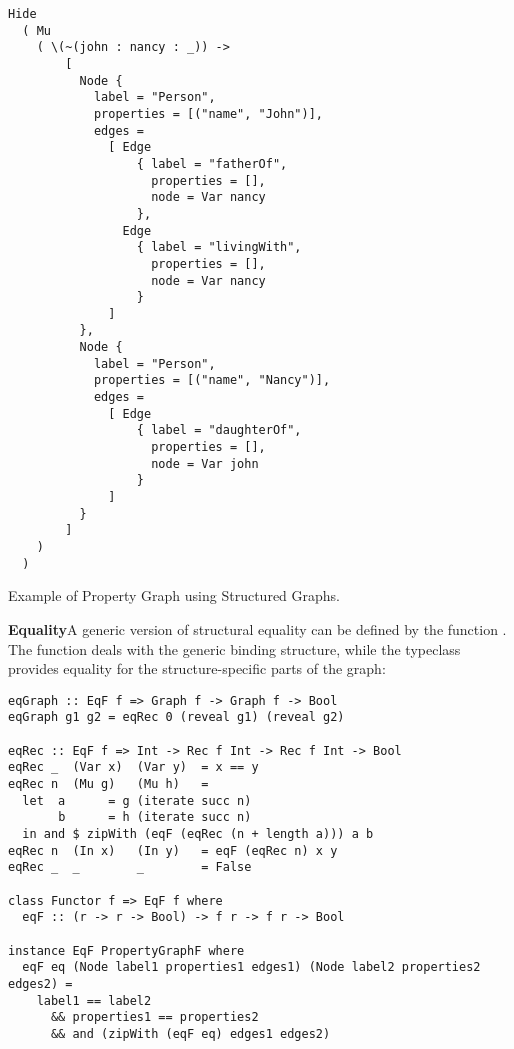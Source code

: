 \begin{listing}[H]
\begin{verbatim}
Hide
  ( Mu
    ( \(~(john : nancy : _)) ->
        [
          Node {
            label = "Person",
            properties = [("name", "John")],
            edges =
              [ Edge
                  { label = "fatherOf",
                    properties = [],
                    node = Var nancy
                  },
                Edge
                  { label = "livingWith",
                    properties = [],
                    node = Var nancy
                  }
              ]
          },
          Node {
            label = "Person",
            properties = [("name", "Nancy")],
            edges =
              [ Edge
                  { label = "daughterOf",
                    properties = [],
                    node = Var john
                  }
              ]
          }
        ]
    )
  )
\end{verbatim}
\caption{Example of Property Graph using Structured Graphs.}
\label{lst:property-graph-example}
\end{listing}

\textbf{Equality}\quad A generic version of structural equality can be defined by the function . The function  deals with the generic binding structure, while the typeclass  provides equality for the structure-specific parts of the graph:

\vspace{1mm}
\begin{verbatim}
eqGraph :: EqF f => Graph f -> Graph f -> Bool
eqGraph g1 g2 = eqRec 0 (reveal g1) (reveal g2)

eqRec :: EqF f => Int -> Rec f Int -> Rec f Int -> Bool
eqRec _  (Var x)  (Var y)  = x == y
eqRec n  (Mu g)   (Mu h)   =
  let  a      = g (iterate succ n)
       b      = h (iterate succ n)
  in and $ zipWith (eqF (eqRec (n + length a))) a b
eqRec n  (In x)   (In y)   = eqF (eqRec n) x y
eqRec _  _        _        = False

class Functor f => EqF f where
  eqF :: (r -> r -> Bool) -> f r -> f r -> Bool

instance EqF PropertyGraphF where
  eqF eq (Node label1 properties1 edges1) (Node label2 properties2 edges2) =
    label1 == label2
      && properties1 == properties2
      && and (zipWith (eqF eq) edges1 edges2)
\end{verbatim}
\vspace{1mm}

